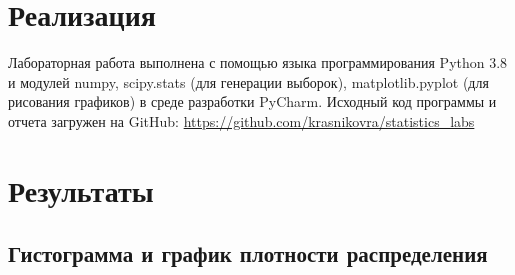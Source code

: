 \documentclass[12pt]{article}
\begin{document}
	\section{Реализация}
	
	Лабораторная работа выполнена с помощью языка программирования Python 3.8 и модулей numpy, scipy.stats (для генерации выборок), matplotlib.pyplot (для рисования графиков) в среде разработки PyCharm. Исходный код программы и отчета загружен на GitHub: \url{https://github.com/krasnikovra/statistics_labs}
	
	\section{Результаты}
	
	\subsection{Гистограмма и график плотности распределения}
	
\end{document}
